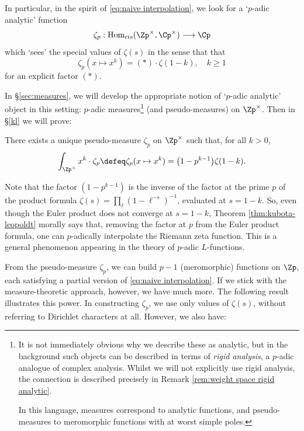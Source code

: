 \documentclass[a4paper,10pt, english, reqno]{smfart}
\newcommand{\Homc}{\mathrm{Hom}_{\mathrm{cts}}}
\numberwithin{equation}{section}
\begin{document}
In particular, in the spirit of \eqref{eq:naive interpolation}, we look for a `$p$-adic analytic' function
\[ 
\zeta_p : \Homc(\Zp^\times,\Cp^\times) \longrightarrow \Cp 
\]
which `sees' the special values of $\zeta(s)$ in the sense that that
\[\zeta_p(x \mapsto x^k) = (*) \cdot \zeta(1-k), \hspace{12pt} k \geq 1 \]
for an explicit factor $(*)$.

 In \S\ref{sec:measures}, we will develop the appropriate notion of `$p$-adic analytic' object in this setting: $p$-adic measures\footnote{It is not immediately obvious why we describe these as analytic, but in the background such objects can be described in terms of \emph{rigid analysis}, a $p$-adic analogue of complex analysis. Whilst we will not explicitly use rigid analysis, the connection is described precisely in Remark \ref{rem:weight space rigid analytic}.

\hspace{8pt} In this language, measures correspond to analytic functions, and pseudo-measures to meromorphic functions with at worst simple poles.}  (and pseudo-measures) on $\Zp^\times$. Then in \S\ref{kl} we will prove:

\begin{theorem} \label{thm:kubota-leopoldt}
	 There exists a unique pseudo-measure %
  $\zeta_p$ on $\Zp^\times$ such that, for all $k > 0$,
	\[\int_{\Zp^\times} x^k \cdot \zeta_p \defeq \zeta_p(x\mapsto x^k) = \big(1-p^{k-1}\big)\zeta(1-k).\]
\end{theorem}

\begin{remark}
	 Note that the factor $(1 - p^{k-1})$ is  the inverse of the factor at the prime $p$ of the product formula $\zeta(s) = \prod_{\ell} (1-\ell^{-s})^{-1}$, evaluated at $s = 1-k$. So, even though the Euler product does not converge at $s = 1 - k$, Theorem \ref{thm:kubota-leopoldt} morally says  that, removing the factor at $p$ from the Euler product formula, one can $p$-adically interpolate the Riemann zeta function. This is a general phenomenon appearing in the theory of $p$-adic $L$-functions.
\end{remark}

From the pseudo-measure $\zeta_p$, we can build $p-1$ (meromorphic) functions on $\Zp$, each satisfying a partial version of \eqref{eq:naive interpolation}. If we stick with the measure-theoretic approach, however, we have much more. The following result illustrates this power. In constructing $\zeta_p$, we use only values of $\zeta(s)$, without referring to Dirichlet characters at all. However, we also have:
\end{document}

